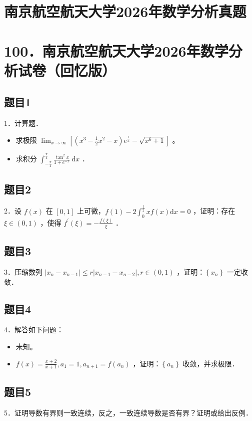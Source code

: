 \documentclass{article}
\begin{document}
\section*{南京航空航天大学2026年数学分析真题}
\section*{100．南京航空航天大学2026年数学分析试卷（回忆版）}

\subsection{题目1}
1．计算题．

\begin{itemize}
  \item[（1）] 求极限 \(\lim _{x \rightarrow \infty}\left[\left(x^{3}-\frac{1}{2} x^{2}-x\right) e^{\frac{1}{x}}-\sqrt{x^{6}+1}\right]\) 。
  \item[（2）] 求积分 \(\int_{-\frac{\pi}{4}}^{\frac{\pi}{4}} \frac{\tan ^{2} x}{1+e^{-x}} \mathrm{~d} x\) ．
\end{itemize}

\subsection{题目2}
2．设 \(f(x)\) 在 \([0,1]\) 上可微，\(f(1)-2 \int_{0}^{\frac{1}{2}} x f(x) \mathrm{d} x=0\) ，证明：存在 \(\xi \in(0,1)\) ，使得 \(f^{\prime}(\xi)=-\frac{f(\xi)}{\xi}\) ．

\subsection{题目3}
3．压缩数列 \(\left|x_{n}-x_{n-1}\right| \leq r\left|x_{n-1}-x_{n-2}\right|, r \in(0,1)\) ，证明：\(\left\{x_{n}\right\}\) 一定收敛．

\subsection{题目4}
4．解答如下问题：

\begin{itemize}
  \item[（1）] 未知。
  \item[（2）] \(f(x)=\frac{x+2}{x+1}, a_{1}=1, a_{n+1}=f\left(a_{n}\right)\) ，证明：\(\left\{a_{n}\right\}\) 收敛，并求极限．
\end{itemize}

\subsection{题目5}
5．证明导数有界则一致连续，反之，一致连续导数是否有界？证明或给出反例．
\end{document}
